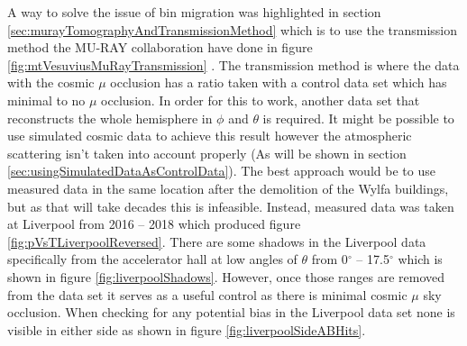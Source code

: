 A way to solve the issue of bin migration was highlighted in section \ref{sec:murayTomographyAndTransmissionMethod} which is to use the transmission method the MU-RAY collaboration have done in figure \ref{fig:mtVesuviusMuRayTransmission} \cite{Ambrosino_2014}. The transmission method is where the data with the cosmic $\mu$ occlusion has a ratio taken with a control data set which has minimal to no $\mu$ occlusion. In order for this to work, another data set that reconstructs the whole hemisphere in $\phi$ and $\theta$ is required. It might be possible to use simulated cosmic data to achieve this result however the atmospheric scattering isn't taken into account properly (As will be shown in section \ref{sec:usingSimulatedDataAsControlData}). The best approach would be to use measured data in the same location after the demolition of the Wylfa buildings, but as that will take decades this is infeasible. Instead, measured data was taken at Liverpool from 2016 -- 2018 which produced figure \ref{fig:pVsTLiverpoolReversed}. There are some shadows in the Liverpool data specifically from the accelerator hall at low angles of $\theta$ from 0$^\circ$ -- 17.5$^\circ$ which is shown in figure \ref{fig:liverpoolShadows}. However, once those ranges are removed from the data set it serves as a useful control as there is minimal cosmic $\mu$ sky occlusion. When checking for any potential bias in the Liverpool data set none is visible in either side as shown in figure \ref{fig:liverpoolSideABHits}. 

